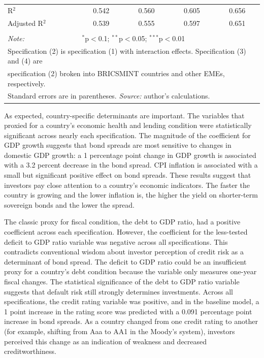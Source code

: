 \documentclass[12pt]{article}
\begin{document}
\begin{table}[!htbp]
\begin{tabular}{@{\extracolsep{5pt}}lcccc}
R$^{2}$ & 0.542 & 0.560 & 0.605 & 0.656 \\ 
Adjusted R$^{2}$ & 0.539 & 0.555 & 0.597 & 0.651 \\ 
\hline 
\hline \\[-1.8ex] 
\textit{Note:}  & \multicolumn{4}{l}{$^{*}$p$<$0.1; $^{**}$p$<$0.05; $^{***}$p$<$0.01} \\ 
\multicolumn{5}{l}{Specification (2) is specification (1) with interaction effects. Specification (3) and (4) are}\\
\multicolumn{5}{l}{specification (2) broken into BRICSMINT countries and other EMEs, respectively.}\\
\multicolumn{5}{l}{Standard errors are in parentheses. \textit{Source:} author's calculations.}\\
\end{tabular} 
\end{table} 
As expected, country-specific determinants are important. The variables that proxied for a country's economic health and lending condition were statistically significant across nearly each specification. The magnitude of the coefficient for GDP growth suggests that bond spreads are most sensitive to changes in domestic GDP growth: a 1 percentage point change in GDP growth is associated with a 3.2 percent decrease in the bond spread. CPI inflation is associated with a small but significant positive effect on bond spreads. These results suggest that investors pay close attention to a country's economic indicators. The faster the country is growing and the lower inflation is, the higher the yield on shorter-term sovereign bonds and the lower the spread.

The classic proxy for fiscal condition, the debt to GDP ratio, had a positive coefficient across each specification. However, the coefficient for the less-tested deficit to GDP ratio variable was negative across all specifications. This contradicts conventional wisdom about investor perception of credit risk as a determinant of bond spread. The deficit to GDP ratio could be an insufficient proxy for a country's debt condition because the variable only measures one-year fiscal changes. The statistical significance of the debt to GDP ratio variable suggests that default risk still strongly determines investments. Across all specifications, the credit rating variable was positive, and in the baseline model, a 1 point increase in the rating score was predicted with a 0.091 percentage point increase in bond spreads. As a country changed from one credit rating to another (for example, shifting from Aaa to AA1 in the Moody's system), investors perceived this change as an indication of weakness and decreased creditworthiness.
\end{document}
